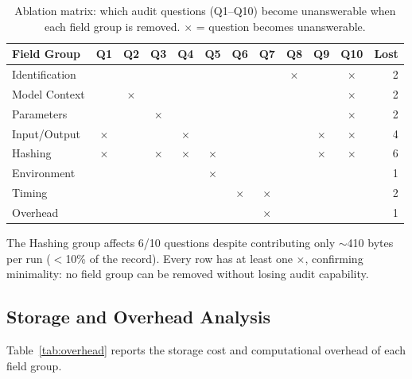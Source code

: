 \documentclass[11pt]{article}
\begin{document}
\begin{table}[H]
\centering
\caption{Ablation matrix: which audit questions (Q1--Q10) become unanswerable when each field group is removed. $\times$ = question becomes unanswerable.}
\label{tab:ablation}
\small
\begin{tabular}{@{}lccccccccccr@{}}
\toprule
\textbf{Field Group} & Q1 & Q2 & Q3 & Q4 & Q5 & Q6 & Q7 & Q8 & Q9 & Q10 & \textbf{Lost} \\
\midrule
Identification  &    &    &    &    &    &    &    & $\times$ &    & $\times$ & 2 \\
Model Context   &    & $\times$ &    &    &    &    &    &    &    & $\times$ & 2 \\
Parameters      &    &    & $\times$ &    &    &    &    &    &    & $\times$ & 2 \\
Input/Output    & $\times$ &    &    & $\times$ &    &    &    &    & $\times$ & $\times$ & 4 \\
Hashing         & $\times$ &    & $\times$ & $\times$ & $\times$ &    &    &    & $\times$ & $\times$ & 6 \\
Environment     &    &    &    &    & $\times$ &    &    &    &    &    & 1 \\
Timing          &    &    &    &    &    & $\times$ & $\times$ &    &    &    & 2 \\
Overhead        &    &    &    &    &    &    & $\times$ &    &    &    & 1 \\
\bottomrule
\end{tabular}
\par\smallskip\raggedright\footnotesize
The Hashing group affects 6/10 questions despite contributing only ${\sim}$410 bytes per run ($<$10\% of the record). Every row has at least one $\times$, confirming minimality: no field group can be removed without losing audit capability.
\end{table}

\subsection{Storage and Overhead Analysis}

Table~\ref{tab:overhead} reports the storage cost and computational overhead of each field group.
\end{document}
